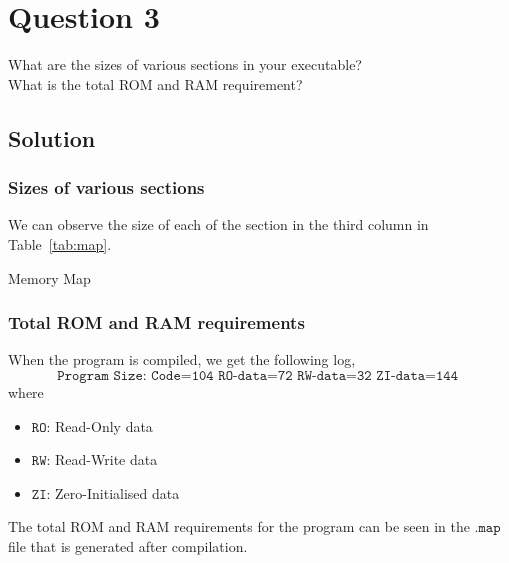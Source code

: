 \section*{Question 3}

What are the sizes of various sections in your executable?\\
What is the total ROM and RAM requirement?

\subsection*{Solution}

\subsubsection*{Sizes of various sections}

We can observe the size of each of the section in the third column in Table~\ref{tab:map}.

\begin{table}[htbp]
    \centering
    \resizebox{0.9\textwidth}{!}{
        
    }
    \caption{
        Memory Map
    }\label{tab:map}
\end{table}

\clearpage
\subsubsection*{Total ROM and RAM requirements}

When the program is compiled, we get the following log,
\[
    \texttt{
        Program Size: Code=104 RO-data=72 RW-data=32 ZI-data=144
    }
\]
where
\begin{itemize}[itemsep=0pt, topsep=0pt, partopsep=0pt, parsep=0pt]
    \item \( \texttt{RO} \): Read-Only data
    \item \( \texttt{RW} \): Read-Write data
    \item \( \texttt{ZI} \): Zero-Initialised data
\end{itemize}

\vspace*{1em}
The total ROM and RAM requirements for the program can be seen in the \( \texttt{.map} \) file that is generated after compilation.

\begin{table}[htbp]
    \centering
    
\end{table}
